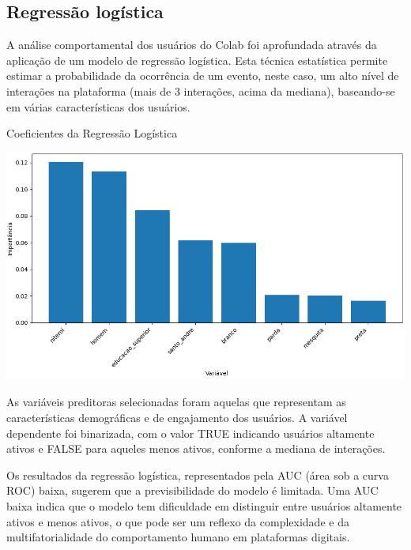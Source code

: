 \subsection*{Regressão logística}

A análise comportamental dos usuários do Colab foi aprofundada através da aplicação de um modelo de regressão logística. Esta técnica estatística permite estimar a probabilidade da ocorrência de um evento, neste caso, um alto nível de interações na plataforma (mais de 3 interações, acima da mediana), baseando-se em várias características dos usuários.

\begin{quadro}[!htb]
	\caption{Coeficientes da Regressão Logística}
	\label{fig:regression_chart}
	\centering
	\includegraphics[scale=0.6]{images/regression_chart.png}
\end{quadro}

As variáveis preditoras selecionadas foram aquelas que representam as características demográficas e de engajamento dos usuários. A variável dependente foi binarizada, com o valor TRUE indicando usuários altamente ativos e FALSE para aqueles menos ativos, conforme a mediana de interações.

Os resultados da regressão logística, representados pela AUC (área sob a curva ROC) baixa, sugerem que a previsibilidade do modelo é limitada. Uma AUC baixa indica que o modelo tem dificuldade em distinguir entre usuários altamente ativos e menos ativos, o que pode ser um reflexo da complexidade e da multifatorialidade do comportamento humano em plataformas digitais.

